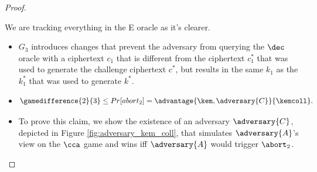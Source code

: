 \begin{proof}
\begin{itemize}
                                                                We are tracking everything in the E oracle as it's clearer.
                                                            \end{itemize}

                                                            \begin{itemize}
                                                            \item[\textbf{Game 3}]
                                                                $G_3$ introduces changes that prevent the adversary from querying the $\dec$ oracle with a ciphertext $c_1$ that is different from the ciphertext $c^*_1$ that was used to generate the challenge ciphertext $c^*$, but results in the same $k_1$ as the $k^*_1$ that was used to generate $k^*$.

                                                            \item[\emph{Claim 3}]

                                                                \[ \gamedifference{2}{3} \leq Pr[abort_2] = \advantage{\kem, \adversary{C}}{\kemcoll}. \]

                                                            \item[\emph{Proof}]
                                                                To prove this claim, we show the existence of an adversary $\adversary{C}$, depicted in Figure \ref{fig:adversary_kem_coll}, that simulates $\adversary{A}$'s view on the $\cca$ game and wins iff $\adversary{A}$ would trigger $\abort_2$.


\end{itemize}
\end{proof}
